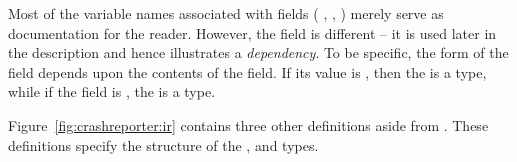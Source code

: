 Most of the variable names associated with fields (\eg{}
, , \etc{}) merely serve as documentation for the reader.
However, the  field is different -- it is used later in the 
description and hence illustrates a {\em dependency}.  
To be specific, the form of the
 field depends upon the contents of the 
field.  If its value is , then the  is
a  type, while if the  field is ,
the  is a  type.  

Figure~\ref{fig:crashreporter:ir} contains three other definitions
aside from .  These definitions specify the
structure of the  ,  and 
types.





